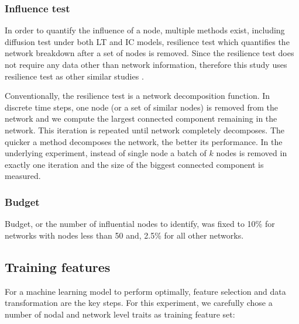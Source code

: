 			\subsubsection{Influence test}
			In order to quantify the influence of a node, multiple methods exist, including diffusion test under both LT and IC models, resilience test \cite{cohen2000} which quantifies the network breakdown after a set of nodes is removed. Since the resilience test does not require any data other than network information, therefore this study uses resilience test as other similar studies \cite{holme2002,morone2015}. 

			Conventionally, the resilience test is a network decomposition function. In discrete time steps, one node (or a set of similar nodes) is removed from the network and we compute the largest connected component remaining in the network. This iteration is repeated until network completely decomposes. The quicker a method decomposes the network, the better its performance. In the underlying experiment, instead of single node a batch of $k$ nodes is removed in exactly one iteration and the size of the biggest connected component is measured.
			
			\subsubsection{Budget}
			Budget, or the number of influential nodes to identify, was fixed to 10\% for networks with nodes less than 50 and, 2.5\% for all other networks.
			
		\subsection{Training features}
		For a machine learning model to perform optimally, feature selection and data transformation are the key steps. For this experiment, we carefully chose a number of nodal and network level traits as training feature set:
		
